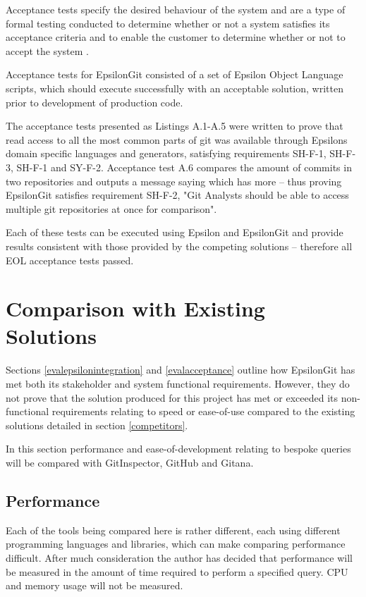 \documentclass[11pt]{book}
\begin{document}
Acceptance tests specify the desired behaviour of the system and are a type of formal testing conducted to determine whether or not a system satisfies its acceptance criteria and to enable the customer to determine whether or not to accept the system \cite{acceptancetests1}\cite{acceptancetests2}. 

Acceptance tests for EpsilonGit consisted of a set of Epsilon Object Language scripts, which should execute successfully with an acceptable solution, written prior to development of production code. 

The acceptance tests presented as Listings A.1-A.5 were written to prove that read access to all the most common parts of git was available through Epsilons domain specific languages and generators, satisfying requirements SH-F-1, SH-F-3, SH-F-1 and SY-F-2. Acceptance test A.6 compares the amount of commits in two repositories and outputs a message saying which has more -- thus proving EpsilonGit satisfies requirement SH-F-2, "Git Analysts should be able to access multiple git repositories at once for comparison".

Each of these tests can be executed using Epsilon and EpsilonGit and provide results consistent with those provided by the competing solutions -- therefore all EOL acceptance tests passed.

\section{Comparison with Existing Solutions}
Sections \ref{evalepsilonintegration} and \ref{evalacceptance} outline how EpsilonGit has met both its stakeholder and system functional requirements. However, they do not prove that the solution produced for this project has met or exceeded its non-functional requirements relating to speed or ease-of-use compared to the existing solutions detailed in section \ref{competitors}.

In this section performance and ease-of-development relating to bespoke queries will be compared with GitInspector, GitHub and Gitana.

\subsection{Performance}
Each of the tools being compared here is rather different, each using different programming languages and libraries, which can make comparing performance difficult. After much consideration the author has decided that performance will be measured in the amount of time required to perform a specified query. CPU and memory usage will not be measured.
\end{document}
